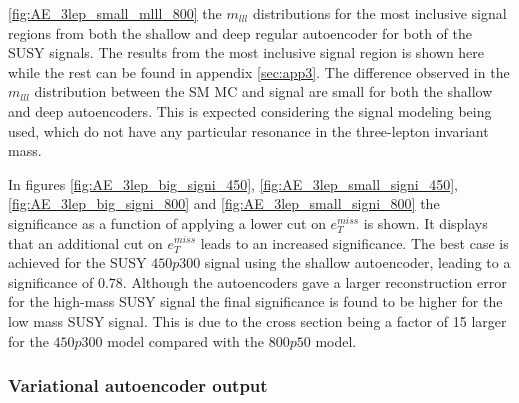 \ref{fig:AE_3lep_small_mlll_800} the $m_{lll}$ distributions for the most inclusive signal 
regions from both the shallow and deep regular 
autoencoder for both of the SUSY signals. The results from the most inclusive signal region is shown here 
while the rest can be found in appendix \ref{sec:app3}. 
The difference observed in the $m_{lll}$ distribution between the SM MC and signal are small for both the 
shallow and deep autoencoders. This is expected considering the signal modeling being used, 
which do not have any particular resonance in the three-lepton invariant mass. \par 
In figures \ref{fig:AE_3lep_big_signi_450}, \ref{fig:AE_3lep_small_signi_450}, \ref{fig:AE_3lep_big_signi_800} and  
\ref{fig:AE_3lep_small_signi_800} the significance as a function of applying a lower cut on $e_T^{miss}$ is shown. 
It displays that an additional cut on $e_T^{miss}$ leads to an increased significance. The best case is achieved for 
the SUSY $450p300$ signal using the shallow autoencoder, leading to a significance of $0.78$.
Although the autoencoders gave a larger reconstruction error for the high-mass SUSY signal the final significance 
is found to be higher for the low mass SUSY signal. This is due to the cross section being a factor of 15 larger 
for the $450p300$ model compared with the $800p50$ model.


\subsubsection*{Variational autoencoder output}\label{sec:3lep_var}


